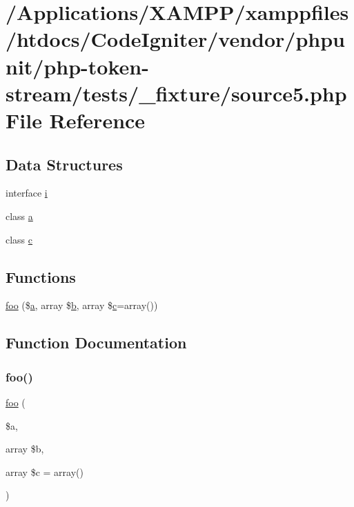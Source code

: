 \hypertarget{source5_8php}{}\section{/\+Applications/\+X\+A\+M\+P\+P/xamppfiles/htdocs/\+Code\+Igniter/vendor/phpunit/php-\/token-\/stream/tests/\+\_\+fixture/source5.php File Reference}
\label{source5_8php}
\subsection*{Data Structures}
\begin{DoxyCompactItemize}
\item 
interface \mbox{\hyperlink{interfacei}{i}}
\item 
class \mbox{\hyperlink{interfacea}{a}}
\item 
class \mbox{\hyperlink{classc}{c}}
\end{DoxyCompactItemize}
\subsection*{Functions}
\begin{DoxyCompactItemize}
\item 
\mbox{\hyperlink{source5_8php_aa1d02eb390a2830efba42c5fbbd36544}{foo}} (\$\mbox{\hyperlink{interfacea}{a}}, array \$\mbox{\hyperlink{interfaceb}{b}}, array \$\mbox{\hyperlink{classc}{c}}=array())
\end{DoxyCompactItemize}


\subsection{Function Documentation}
\mbox{\label{source5_8php_aa1d02eb390a2830efba42c5fbbd36544}} 
\subsubsection{\texorpdfstring{foo()}{foo()}}
{\footnotesize\ttfamily \mbox{\hyperlink{interfacefoo}{foo}} (\begin{DoxyParamCaption}\item[{}]{\$a,  }\item[{array}]{\$b,  }\item[{array}]{\$c = {\ttfamily array()} }\end{DoxyParamCaption})}

